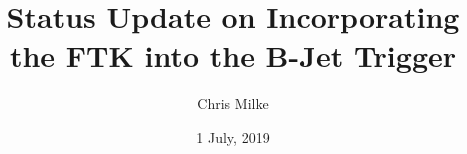 \documentclass{beamer}
\begin{document}
\title{Status Update on Incorporating the FTK into the B-Jet Trigger}   
\author{Chris Milke} 
\date{1 July, 2019} 

\frame{\titlepage} 







\end{document}

